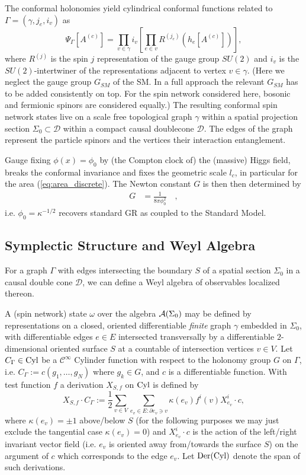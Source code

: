 \documentclass[11pt,a4paper]{article}
\theoremstyle{definition}
\newcommand{\beq}[1]{\begin{equation}\label{#1}}
\newcommand{\eeq}{\end{equation}}
\newcommand{\Cinf}{ {\mathcal{C}}^\infty }
\newcommand{\Cyl}{ \mbox{\rm Cyl} }
\newcommand{\Der}{ \mbox{\rm Der}(\Cyl) }
\newcommand{\partl}{ {\partial } }
\begin{document}
	The conformal holonomies yield cylindrical conformal functions related 
	to $\Gamma = (\gamma, j_e, i_v)$ as
	\begin{equation}
		\Psi_\Gamma[A^{(c)}] = \prod_{v \in \gamma} i_v \left[ \prod_{e \in v} R^{(j_e)} (h_e[A^{(c)}]) \right] ,
	\end{equation}
	where $R^{(j)}$ is the spin $j$ representation of the gauge group $SU(2)$ and $i_v$ is the $SU(2)$-intertwiner of the representations adjacent to vertex $v\in\gamma$. (Here we neglect the gauge group $G_{SM}$ of the SM. In a full approach the relevant $G_{SM}$ has to be added consistently on top. For the spin network considered here, bosonic and fermionic spinors are considered equally.)
	The resulting conformal  spin network states live on a scale free topological graph $\gamma$ within a spatial projection section  $\Sigma_0\subset\mathcal{D}$ within a compact causal doublecone $\mathcal{D}$. The edges of the graph represent the particle spinors and the vertices their interaction  entanglement.
	
	Gauge fixing $\phi(x) = \phi_0 $ by (the Compton clock of) the (massive) Higgs field, breaks the conformal invariance and fixes the geometric scale $l_c$, in particular for the area (\ref{eq:area_discrete}).  
	The Newton constant $G$ is then then determined by
	\begin{align}
		G &= \frac{1}{8\pi\phi_0^2} \quad ,
	\end{align}
	i.e. $\phi_0 = \kappa^{-1/2}$ recovers standard GR as coupled to the Standard Model.
	
	\subsection{Symplectic Structure and Weyl Algebra}
	
	For a graph $\Gamma$ with edges intersecting the boundary $S$ of a spatial section $\Sigma_0$ in  a causal double cone $\mathcal{D}$, we can define a Weyl algebra of observables localized thereon.
	
	A (spin network) state $\omega$ over the algebra ${\cal A}(\Sigma_0)$
	may be defined by representations on
	a closed, oriented differentiable {\em finite} graph $\gamma$
	embedded in $\Sigma_0$,
	with differentiable edges $e\in E$
	intersected transversally by a
	differentiable $2$-dimensional oriented surface $S$
	at a countable of intersection vertices $v\in V$.
	Let $C_{\Gamma}\in \Cyl$ be a $\Cinf$ Cylinder function with respect to the holonomy group $G$ on $\Gamma$, i.e. $C_{\Gamma}:=c(g_1,\ldots,g_N)$ where $g_k\in G$,
	and $c$ is a differentiable function.
	With test function $f$ a derivation
	$X_{S,f}$ on $\Cyl$ is defined by
	\beq{deriv}
	X_{S,f}\cdot C_{\Gamma}:=\frac{1}{2}
	\sum_{v\in V}\sum_{e_v\in E:\partl e_v\ni v}
	\kappa(e_v) f^i(v) X^i_{e_v} \cdot c ,
	\eeq
	where $\kappa(e_v)=\pm1$ above/below $S$
	(for the following purposes we may just exclude the tangential
	case $\kappa(e_v)=0$)
	and $ X^i_{e_v} \cdot c $ is the action of the left/right invariant
	vector field (i.e. $e_v$ is oriented away from/towards the
	surface $S$) on the argument of $c$ which corresponds to the
	edge $e_v$. Let $\Der$ denote the span of such derivations.
	
\end{document}
